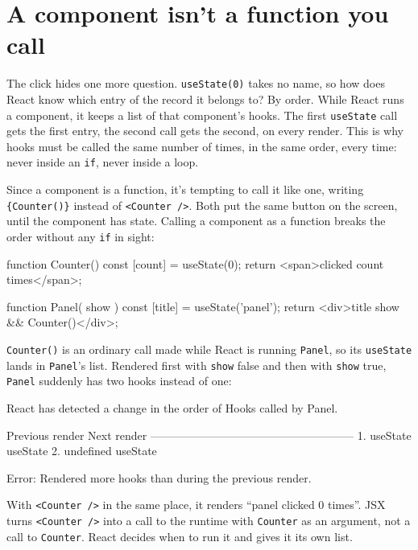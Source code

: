 \section{A component isn't a function you call}

The click hides one more question. \texttt{useState(0)} takes no name, so how
does React know which entry of the record it belongs to? By order. While React runs a component, it keeps
a list of that component's hooks. The first \texttt{useState} call gets the
first entry, the second call gets the second, on every render. This is why hooks
must be called the same number of times, in the same order, every time: never
inside an \texttt{if}, never inside a loop.

Since a component is a function, it's tempting to call it like one, writing
\texttt{\{Counter()\}} instead of \texttt{<Counter />}. Both put the same
button on the screen, until the component has state. Calling a component as a
function breaks the order without any \texttt{if} in sight:

\begin{code}
function Counter() {
  const [count] = useState(0);
  return <span>clicked {count} times</span>;
}

function Panel({ show }) {
  const [title] = useState('panel');
  return <div>{title} {show && Counter()}</div>;
}
\end{code}

\texttt{Counter()} is an ordinary call made while React is running
\texttt{Panel}, so its \texttt{useState} lands in \texttt{Panel}'s list.
Rendered first with \texttt{show} false and then with \texttt{show} true,
\texttt{Panel} suddenly has two hooks instead of one:

\begin{terminal}
React has detected a change in the order of Hooks called by Panel.

   Previous render            Next render
   ------------------------------------------------------
1. useState                   useState
2. undefined                  useState
   ^^^^^^^^^^^^^^^^^^^^^^^^^^^^^^^^^^^^^^^^^^^^^^^^^^^^^^

Error: Rendered more hooks than during the previous render.
\end{terminal}

With \texttt{<Counter />} in the same place, it renders ``panel clicked 0
times''. JSX turns \texttt{<Counter />} into a call to the runtime with
\texttt{Counter} as an argument, not a call to \texttt{Counter}. React decides
when to run it and gives it its own list.

